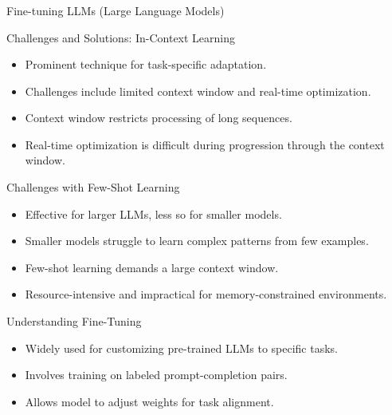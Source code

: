 \begin{frame}[fragile]\frametitle{}
\begin{center}
{\Large Fine-tuning LLMs (Large Language Models)}
\end{center}
\end{frame}

\begin{frame}[fragile]{Challenges and Solutions: In-Context Learning}
    \begin{itemize}
        \item Prominent technique for task-specific adaptation.
        \item Challenges include limited context window and real-time optimization.
        \item Context window restricts processing of long sequences.
        \item Real-time optimization is difficult during progression through the context window.
    \end{itemize}
\end{frame}

\begin{frame}[fragile]{Challenges with Few-Shot Learning}
    \begin{itemize}
        \item Effective for larger LLMs, less so for smaller models.
        \item Smaller models struggle to learn complex patterns from few examples.
        \item Few-shot learning demands a large context window.
        \item Resource-intensive and impractical for memory-constrained environments.
    \end{itemize}
\end{frame}

\begin{frame}[fragile]{Understanding Fine-Tuning}
    \begin{itemize}
        \item Widely used for customizing pre-trained LLMs to specific tasks.
        \item Involves training on labeled prompt-completion pairs.
        \item Allows model to adjust weights for task alignment.
    \end{itemize}
\end{frame}

